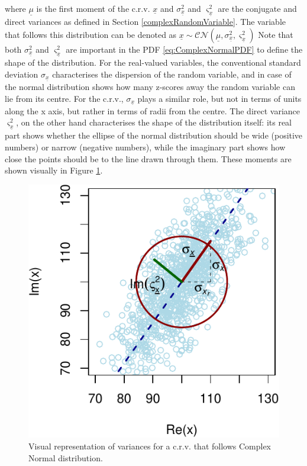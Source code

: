 \documentclass[
]{book}
\begin{document}
where \(\underline{\mu}\) is the first moment of the c.r.v. \(\underline{x}\) and \(\sigma_{\underline{x}}^2\) and \(\varsigma_{\underline{x}}^2\) are the conjugate and direct variances as defined in Section \ref{complexRandomVariable}. The variable that follows this distribution can be denoted as \(\underline{x} \sim \mathcal{CN}(\underline{\mu}, \sigma_{\underline{x}}^2, \varsigma_{\underline{x}}^2)\) Note that both \(\sigma_{\underline{x}}^2\) and \(\varsigma_{\underline{x}}^2\) are important in the PDF \eqref{eq:ComplexNormalPDF} to define the shape of the distribution. For the real-valued variables, the conventional standard deviation \(\sigma_{\underline{x}}\) characterises the dispersion of the random variable, and in case of the normal distribution shows how many z-scores away the random variable can lie from its centre. For the c.r.v., \(\sigma_{\underline{x}}\) plays a similar role, but not in terms of units along the x axis, but rather in terms of radii from the centre. The direct variance \(\varsigma_{\underline{x}}^2\), on the other hand characterises the shape of the distribution itself: its real part shows whether the ellipse of the normal distribution should be wide (positive numbers) or narrow (negative numbers), while the imaginary part shows how close the points should be to the line drawn through them. These moments are shown visually in Figure \ref{fig:crvNormalMoments}.

\begin{figure}
\centering
\includegraphics{Svetunkov---Svetunkov---Complex-Valued-Econometrics_files/figure-latex/crvNormalMoments-1.pdf}
\caption{\label{fig:crvNormalMoments}Visual representation of variances for a c.r.v. that follows Complex Normal distribution.}
\end{figure}
\end{document}
